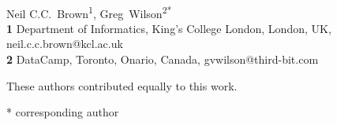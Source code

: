 \documentclass[10pt,letterpaper]{article}
\date{}
\begin{document}
\vspace*{0.2in}

\begin{flushleft}
{\Large
\textbf{} %
}
\newline
\\
{Neil C.C.\ Brown}\textsuperscript{1{\ddag}},
{Greg~Wilson}\textsuperscript{2{\ddag}*}
\\
\bigskip
\textbf{1} Department of Informatics, King's College London, London, UK, neil.c.c.brown@kcl.ac.uk \\
\textbf{2} DataCamp, Toronto, Onario, Canada, gvwilson@third-bit.com \\

\bigskip

%
%
{\ddag} These authors contributed equally to this work.





* corresponding author

\end{flushleft}

\end{document}
